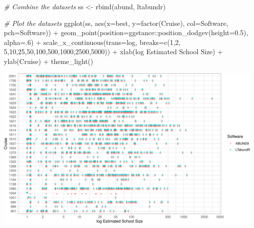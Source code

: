 \documentclass[
]{book}
\newenvironment{Shaded}{\begin{snugshade}}{\end{snugshade}}
\newcommand{\AttributeTok}[1]{\textcolor[rgb]{0.77,0.63,0.00}{#1}}
\newcommand{\CommentTok}[1]{\textcolor[rgb]{0.56,0.35,0.01}{\textit{#1}}}
\newcommand{\DecValTok}[1]{\textcolor[rgb]{0.00,0.00,0.81}{#1}}
\newcommand{\FloatTok}[1]{\textcolor[rgb]{0.00,0.00,0.81}{#1}}
\newcommand{\FunctionTok}[1]{\textcolor[rgb]{0.00,0.00,0.00}{#1}}
\newcommand{\NormalTok}[1]{#1}
\newcommand{\OtherTok}[1]{\textcolor[rgb]{0.56,0.35,0.01}{#1}}
\newcommand{\SpecialCharTok}[1]{\textcolor[rgb]{0.00,0.00,0.00}{#1}}
\newcommand{\StringTok}[1]{\textcolor[rgb]{0.31,0.60,0.02}{#1}}
\begin{document}
\begin{Shaded}
\begin{Highlighting}[]
\CommentTok{\# Combine the datasets}
\NormalTok{ss }\OtherTok{\textless{}{-}} \FunctionTok{rbind}\NormalTok{(abund, ltabundr)}

\CommentTok{\# Plot the datasets}
\FunctionTok{ggplot}\NormalTok{(ss,}
       \FunctionTok{aes}\NormalTok{(}\AttributeTok{x=}\NormalTok{best, }
           \AttributeTok{y=}\FunctionTok{factor}\NormalTok{(Cruise), }
           \AttributeTok{col=}\NormalTok{Software, }
           \AttributeTok{pch=}\NormalTok{Software)) }\SpecialCharTok{+} 
      \FunctionTok{geom\_point}\NormalTok{(}\AttributeTok{position=}\NormalTok{ggstance}\SpecialCharTok{::}\FunctionTok{position\_dodgev}\NormalTok{(}\AttributeTok{height=}\FloatTok{0.5}\NormalTok{),}
                 \AttributeTok{alpha=}\NormalTok{.}\DecValTok{6}\NormalTok{) }\SpecialCharTok{+}
      \FunctionTok{scale\_x\_continuous}\NormalTok{(}\AttributeTok{trans=}\StringTok{\textquotesingle{}log\textquotesingle{}}\NormalTok{, }\AttributeTok{breaks=}\FunctionTok{c}\NormalTok{(}\DecValTok{1}\NormalTok{,}\DecValTok{2}\NormalTok{, }\DecValTok{5}\NormalTok{,}\DecValTok{10}\NormalTok{,}\DecValTok{25}\NormalTok{,}\DecValTok{50}\NormalTok{,}\DecValTok{100}\NormalTok{,}\DecValTok{500}\NormalTok{,}\DecValTok{1000}\NormalTok{,}\DecValTok{2500}\NormalTok{,}\DecValTok{5000}\NormalTok{)) }\SpecialCharTok{+}
      \FunctionTok{xlab}\NormalTok{(}\StringTok{\textquotesingle{}log Estimated School Size\textquotesingle{}}\NormalTok{) }\SpecialCharTok{+}
      \FunctionTok{ylab}\NormalTok{(}\StringTok{\textquotesingle{}Cruise\textquotesingle{}}\NormalTok{) }\SpecialCharTok{+} 
  \FunctionTok{theme\_light}\NormalTok{()}
\end{Highlighting}
\end{Shaded}

\includegraphics{figures/unnamed-chunk-128-1.pdf}
\end{document}
